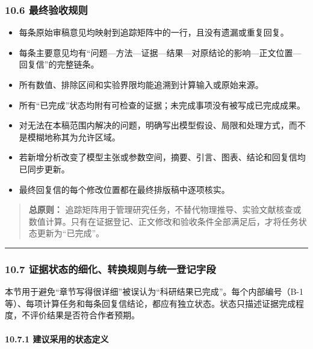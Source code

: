 \documentclass[
  chinese,
  UTF8]{ctexart}
\providecommand{\tightlist}{%
  \setlength{\itemsep}{0pt}\setlength{\parskip}{0pt}}
\begin{document}
\subsubsection{10.6
最终验收规则}\label{ux6700ux7ec8ux9a8cux6536ux89c4ux5219}

\begin{itemize}
\tightlist
\item[$\square$]
  每条原始审稿意见均映射到追踪矩阵中的一行，且没有遗漏或重复回复。
\item[$\square$]
  每条主要意见均有``问题---方法---证据---结果---对原结论的影响---正文位置---回复信''的完整链条。
\item[$\square$]
  所有数值、排除区间和实验界限均能追溯到计算输入或原始来源。
\item[$\square$]
  所有``已完成''状态均附有可检查的证据；未完成事项没有被写成已完成成果。
\item[$\square$]
  对无法在本稿范围内解决的问题，明确写出模型假设、局限和处理方式，而不是模糊地称其为允许区域。
\item[$\square$]
  若新增分析改变了模型主张或参数空间，摘要、引言、图表、结论和回复信均已同步更新。
\item[$\square$]
  最终回复信的每个修改位置都在最终排版稿中逐项核实。
\end{itemize}

\begin{quote}
\textbf{总原则：}
追踪矩阵用于管理研究任务，不替代物理推导、实验文献核查或数值计算。只有在证据登记、正文修改和验收条件全部满足后，才将任务状态更新为``已完成''。
\end{quote}

\begin{center}\rule{0.5\linewidth}{0.5pt}\end{center}

\subsubsection{10.7
证据状态的细化、转换规则与统一登记字段}\label{ux8bc1ux636eux72b6ux6001ux7684ux7ec6ux5316ux8f6cux6362ux89c4ux5219ux4e0eux7edfux4e00ux767bux8bb0ux5b57ux6bb5}

本节用于避免``章节写得很详细''被误认为``科研结果已完成''。每个内部编号（B-1
等）、每项计算任务和每条回复信结论，都应有独立状态。状态只描述证据完成程度，不评价结果是否符合作者预期。

\paragraph{10.7.1
建议采用的状态定义}\label{ux5efaux8baeux91c7ux7528ux7684ux72b6ux6001ux5b9aux4e49}
\end{document}
